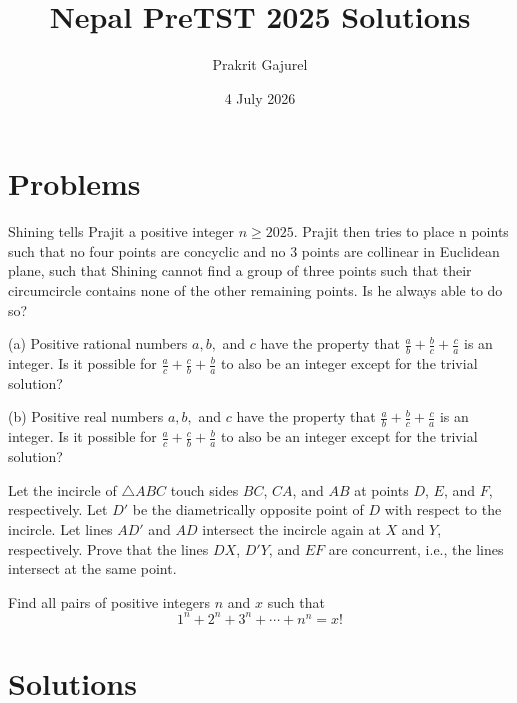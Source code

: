 \documentclass[11pt]{scrartcl}
\begin{document}
\title{Nepal PreTST 2025 Solutions}
\author{Prakrit Gajurel}
\date{4 July 2026}
\maketitle

\section{Problems}

\begin{problem}
    Shining tells Prajit a positive integer $n \ge 2025$. Prajit then tries to place n points such that no four points are concyclic and no
    $3$ points are collinear in Euclidean plane, such that Shining cannot find a group of three points such that their circumcircle contains
    none of the other remaining points. Is he always able to do so?
\end{problem}

\begin{problem}
    (a) Positive rational numbers $a, b,$ and $c$ have the property that $\frac{a}{b} + \frac{b}{c} + \frac{c}{a}$ is an integer. 
    Is it possible for $\frac{a}{c} + \frac{c}{b} + \frac{b}{a}$ to also be an integer except for the trivial solution?

    (b) Positive real numbers $a, b,$ and $c$ have the property that $\frac{a}{b} + \frac{b}{c} + \frac{c}{a}$ is an integer. 
    Is it possible for $\frac{a}{c} + \frac{c}{b} + \frac{b}{a}$ to also be an integer except for the trivial solution?
\end{problem}

\begin{problem}
    Let the incircle of $\triangle ABC$ touch sides $BC$, $CA$, and $AB$ at points $D$, $E$, and $F$, respectively. Let $D'$ be the diametrically
    opposite point of $D$ with respect to the incircle. Let lines $AD'$ and $AD$ intersect the incircle again at $X$ and $Y$, respectively.
    Prove that the lines $DX$, $D'Y$, and $EF$ are concurrent, i.e., the lines intersect at the same point.
\end{problem}

\begin{problem}
    Find all pairs of positive integers \( n \) and \( x \) such that
    \[
    1^n + 2^n + 3^n + \cdots + n^n = x!
    \]
\end{problem}

\newpage{}

\section{Solutions}
\end{document}
